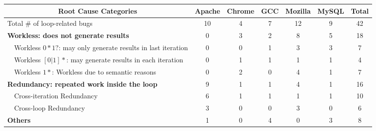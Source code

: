 \begin{tabular}{|l|c|c|c|c|c|c|}
\hline
\multicolumn{1}{|c|}{Root Cause Categories} &Apache&Chrome&GCC&Mozilla&MySQL&Total\\
\hline
Total \# of loop-related bugs    & 10 & 4 & 7 & 12 & 9 & 42 \\
\hline
\multicolumn{1}{|l|}{\textbf{Workless: does not generate results}}
&0&3&2&8&5&18\\
\ \ Workless $0*1?$: may only generate results in last iteration &0&0&1&3&3&7\\
\ \ Workless $[0|1]*$: may generate results in each iteration    &0&1&1&1&1&4\\
\ \ Workless $1*$: Workless due to semantic reasons              &0&2&0&4&1&7\\
\hline
\multicolumn{1}{|l|}{\textbf{Redundancy: repeated work inside the loop}}
&9&1&1&4&1&16\\
\ \ Cross-iteration Redundancy
&6&1&1&1&1&10\\
\ \ Cross-loop Redundancy
&3&0&0&3&0&6\\
\hline
\multicolumn{1}{|l|}{\textbf{Others}}
&1&0&4&0&3&8\\
\hline
\end{tabular}


